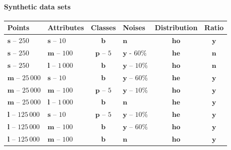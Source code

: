 \documentclass[aspectratio=169,dvipsnames]{beamer}
\begin{document}
\begin{frame}{\secname}
	\framesubtitle{Synthetic data sets}

	\begin{adjustbox}{max height=0.75\textheight, center}
		\begin{NiceTabular}{|l|l|c|l|c|c|}
			\hline
			\textbf{Points} & \textbf{Attributes} & \textbf{Classes} & \textbf{Noises} & \textbf{Distribution} & \textbf{Ratio} \\
			\hline
			$\mathbf{s}$ -- $250$ & $\mathbf{s}$ -- $10$ & $\mathbf{b}$& $\mathbf{n}$ & $\mathbf{ho}$ & $\mathbf{y}$ \\
			$\mathbf{s}$ -- $250$ & $\mathbf{m}$ -- $100$ & $\mathbf{p}$ -- $5$ & $\mathbf{y}$ - $60\%$ & $\mathbf{he}$ & $\mathbf{n}$ \\
			$\mathbf{s}$ -- $250$ & $\mathbf{l}$ -- $1\,000$ & $\mathbf{b}$ & $\mathbf{y}$ -- $10\%$ & $\mathbf{ho}$ & $\mathbf{n}$ \\
			$\mathbf{m}$ -- $25\,000$ & $\mathbf{s}$ -- $10$ & $\mathbf{b}$ & $\mathbf{y}$ -- $60\%$ & $\mathbf{he}$ & $\mathbf{y}$ \\
			$\mathbf{m}$ -- $25\,000$ & $\mathbf{m}$ -- $100$ & $\mathbf{p}$ -- $5$ & $\mathbf{y}$ -- $10\%$ & $\mathbf{ho}$ & $\mathbf{y}$ \\
			$\mathbf{m}$ -- $25\,000$ & $\mathbf{l}$ -- $1\,000$ & $\mathbf{b}$ & $\mathbf{n}$ & $\mathbf{he}$ & $\mathbf{y}$ \\
			$\mathbf{l}$ -- $125\,000$ & $\mathbf{s}$ -- $10$ & $\mathbf{p}$ -- $5$ & $\mathbf{y}$ -- $10\%$ & $\mathbf{he}$ & $\mathbf{y}$ \\
			$\mathbf{l}$ -- $125\,000$ & $\mathbf{m}$ -- $100$ & $\mathbf{b}$ & $\mathbf{y}$ -- $60\%$ & $\mathbf{ho}$ & $\mathbf{y}$ \\
			$\mathbf{l}$ -- $125\,000$ & $\mathbf{m}$ -- $100$ & $\mathbf{b}$ & $\mathbf{n}$ & $\mathbf{ho}$ & $\mathbf{y}$ \\
			\hline
		\end{NiceTabular}
	\end{adjustbox}
\end{frame}
\end{document}
